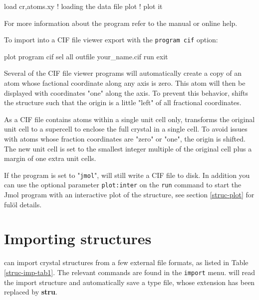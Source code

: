 \begin{MacVerbatim}
    load cr,atoms.xy    ! loading the data file
    plot                ! plot it
\end{MacVerbatim}

For more information about the program \Kuplot refer to the
\Kuplot manual or online help.

To import into a CIF file viewer export with the {\tt program cif}
option:

\begin{MacVerbatim}
  plot
    program cif
    sel     all
    outfile your_name.cif
    run
  exit
\end{MacVerbatim}

Several of the CIF file viewer programs will automatically 
create a copy of an atom whose factional coordinate along 
any axis is zero. This atom will then be displayed with
coordinates "one" along the axis. To prevent this behavior,
\Discus shifts the structure such that the origin is a 
little "left" of all fractional coordinates. 

As a CIF file contains atoms within a single unit cell
only,  \Discus transforms the original unit cell to a
supercell to enclose the full crystal in a single cell.
To avoid issues with atoms whose fraction coordinates
are "zero" or "one", the origin is shifted. The new 
unit cell is set to the smallest integer multiple of
the original cell plus a margin of one extra unit cells.

If the program is set to "{\tt jmol}", \Discus will still 
write a CIF file to disk. In addition you can use the 
optional parameter {\tt plot:inter} on the {\tt run} 
command to start the Jmol program with an interactive
plot of the structure, see section \ref{struc-plot} for
fulöl details.


\section{Importing structures \label{struc-import}}

\Discus can import crystal structures from a few external file formats, 
as listed
in Table \ref{struc-imp-tab1}. The relevant commands are found in the 
{\tt import} menu. \Discus will read the import structure and automatically
save a \Discus type file, whose extension has been replaced by {\bf stru}.

